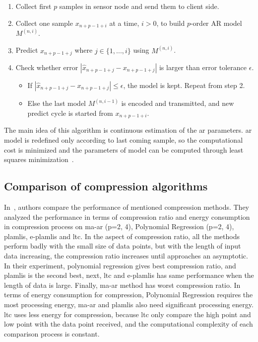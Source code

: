 \begin{enumerate}
    \item Collect first $p$ samples in sensor node and send them to client side.
    \item Collect one sample $x_{n+p-1+i}$ at a time, $i > 0$, to build
    $p$-order
    AR model $M^{(n, i)}$.
    \item Predict $x_{n+p-1+j}$ where $j \in \{1, ..., i\}$ using $M^{(n, i)}$.
    \item Check whether error $ |\hat{x}_{n+p-1+j} - x_{n+p-1+j}|$ is larger
    than error tolerance $\epsilon$.
        \begin{itemize}
            \item If $|\hat{x}_{n+p-1+j} - x_{n+p-1+j}| \leqslant \epsilon$, the
            model is kept. Repeat from step 2.
            \item Else the last model $M^{(n, i-1)}$ is encoded and transmitted,
            and new predict cycle is started from $x_{n+p-1+i}$.
        \end{itemize}
\end{enumerate}
The main idea of this algorithm is continuous estimation of the \acrshort{ar}
parameters. \acrshort{ar} model is redefined only according to last coming
sample, so the computational cost is minimized and the parameters of model can
be computed through least squares minimization~\cite{zordan2012compress}.


\subsection{Comparison of compression algorithms}
\label{sec:comparision-lossy}
In~\cite{zordan2014performance}, authors compare the performance of mentioned
compression methods. They analyzed the performance in terms of compression ratio
and energy consumption in compression process on \acrshort{ma-ar} (p={2, 4}),
Polynomial Regression (p={2, 4}), \acrshort{plamlis}, \acrshort{e-plamlis} and
\acrshort{ltc}. In the aspect of compression ratio, all the methods perform
badly with the small size of data points, but with the length of input data
increasing, the compression ratio increases until approaches an asymptotic. In
their experiment, polynomial regression gives best compression ratio, and
\acrshort{plamlis} is the second best, next, \acrshort{ltc} and
\acrshort{e-plamlis} has same performance when the length of data is large.
Finally, \acrshort{ma-ar} method has worst compression ratio. In terms of energy
consumption for compression, Polynomial Regression requires the most processing
energy, \acrshort{ma-ar} and \acrshort{plamlis} also need significant processing
energy. \acrshort{ltc} uses less energy for compression, because \acrshort{ltc}
only compare the high point and low point with the data point received, and the
computational complexity of each comparison process is constant.
